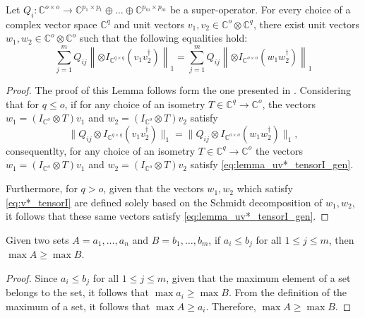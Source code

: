 \begin{lemma} \label{lemma:uv*_tensorI_gen}
  Let $Q_i: \mathbb{C}^{o \times o}  \rightarrow \mathbb{C}^{p_1 \times p_1} \oplus \ldots \oplus  \mathbb{C}^{p_m \times p_m}$ be a super-operator.  For every choice of a complex vector space $\mathbb{C}^{q}$ and unit vectors $v_1, v_2 \in \mathbb{C}^{o} \otimes \mathbb{C}^{q}$, there exist unit vectors $w_1, w_2 \in \mathbb{C}^{o} \otimes \mathbb{C}^{o}$ such that the following equalities hold:
  \begin{equation} \label{eq:lemma_uv*_tensorI_gen}
       \sum_{j=1}^{m} Q_{ij} \left\lVert\otimes I_{\mathbb{C}^{q \times q}} (v_1 v_2^\dag)\right\rVert_{1} = \sum_{j=1}^{m} Q_{ij} \left\lVert \otimes I_{\mathbb{C}^{o \times o}} (w_1 w_2^\dag) \right\rVert_{1}
  \end{equation}
 \begin{proof}
  The proof of this Lemma follows form the one presented in \cite[Proof of Lemma 3.45]{watrous2018theory}. Considering that for $q \leq o$, if for any choice of an isometry $T \in \mathbb{C}^{q} \rightarrow \mathbb{C}^{o} $, the vectors $w_1 = (I_{\mathbb{C}^{o}} \otimes T)v_1$ and $w_2 = (I_{\mathbb{C}^{o}} \otimes T)v_2$  satisfy 
  \begin{equation} \label{eq:v*_tensorI}
    \lVert Q_{ij} \otimes I_{\mathbb{C}^{q \times q}} (v_1 v_2^\dag)\rVert_{1} = \lVert Q_{ij} \otimes I_{\mathbb{C}^{o \times o}} (w_1 w_2^\dag)\rVert_{1},
  \end{equation}
consequentlty, for any choice of an isometry $T \in \mathbb{C}^{q} \rightarrow \mathbb{C}^{o}$ the vectors $w_1 = (I_{\mathbb{C}^{o}} \otimes T)v_1$ and $w_2 = (I_{\mathbb{C}^{o}} \otimes T)v_2$  satisfy \autoref{eq:lemma_uv*_tensorI_gen}.

Furthermore, for $q > o$, given that the vectors $w_1, w_2$ which  satisfy \autoref{eq:v*_tensorI} are defined solely based on the Schmidt decomposition of $w_1, w_2$, it follows that these same vectors satisfy \autoref{eq:lemma_uv*_tensorI_gen}.
 \end{proof}

\end{lemma}


\begin{lemma} \label{lemma:max_sup_set}
  Given two sets $A = {a_1, \ldots, a_n}$ and $B = {b_1, \ldots, b_m}$, if $a_i \leq b_j$ for all $1 \leq j \leq m$, then $\max A \geq \max B$.
\end{lemma}
\begin{proof}
  Since $a_i \leq b_j$ for all $1 \leq j \leq m$, given that the maximum element of a set belongs to the set, it follows that $\max a_i \geq \max B$. From the definition of the maximum of a set, it follows that $\max A \geq a_i$. Therefore, $\max A \geq \max B$.
\end{proof}

